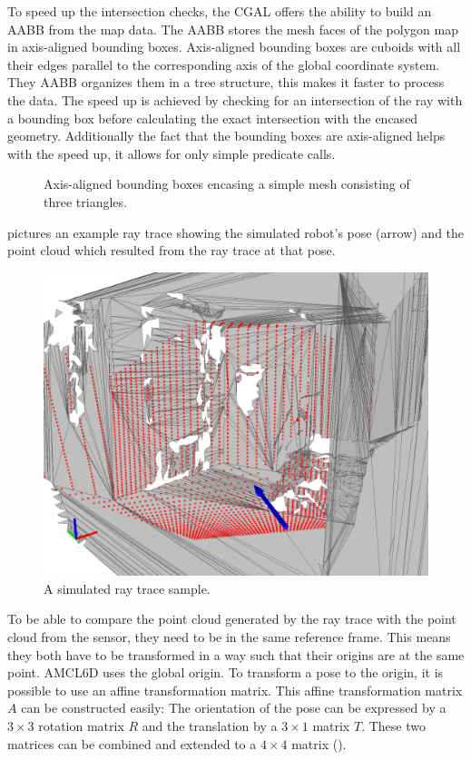 \documentclass[Thesis.tex]{subfiles}
\begin{document}
To speed up the intersection checks, the \gls{CGAL} offers the ability to build an \gls{AABB}\label{page:aabb} from the map data\cite{cgal:atw-aabb-14b}. The \gls{AABB} stores the mesh faces of the polygon map in axis-aligned bounding boxes. Axis-aligned bounding boxes are cuboids with all their edges parallel to the corresponding axis of the global coordinate system. They \gls{AABB} organizes them in a tree structure, this makes it faster to process the data. 
The speed up is achieved by checking for an intersection of the ray with a bounding box before calculating the exact intersection with the encased geometry. Additionally the fact that the bounding boxes are axis-aligned helps with the speed up, it allows for only simple predicate calls\cite{cgal:atw-aabb-14b}.
\begin{figure}%
  \centering
  
  \caption[Axis-aligned bounding boxes]{Axis-aligned bounding boxes encasing a simple mesh consisting of three triangles.}%
  \label{fig:aabb_ex}%
\end{figure}
%
 pictures an example ray trace showing the simulated robot's pose (arrow) and the point cloud which resulted from the ray trace at that pose.
\begin{figure}[!htp]
  \centering
  \includegraphics[width=.75\columnwidth]{pics/example_raytrace}
  \caption[Sample ray trace]{A simulated ray trace sample.}
  \label{fig:raytrace}
\end{figure}
%
To be able to compare the point cloud generated by the ray trace with the point cloud from the sensor, they need to be in the same reference frame. This means they both have to be transformed in a way such that their origins are at the same point. \gls{AMCL6D} uses the global origin.
To transform a pose to the origin, it is possible to use an affine transformation matrix. This affine transformation matrix $A$ can be constructed easily: The orientation of the pose can be expressed by a $3\times3$ rotation matrix $R$ and the translation by a $3\times1$ matrix $T$. These two matrices can be combined and extended to a $4\times4$ matrix ().
\end{document}
